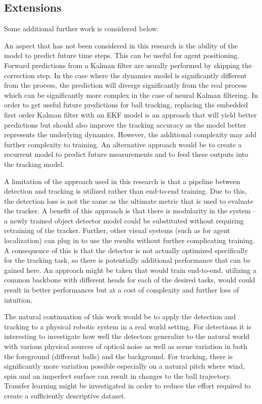 \documentclass[a4paper,twoside,12pt]{report}
\begin{document}
\subsection{Extensions}

Some additional further work is considered below:

An aspect that has not been considered in this research is the ability of the model to predict future time steps. This can be useful for agent positioning. Forward predictions from a Kalman filter are usually performed by skipping the correction step. In the case where the dynamics model is significantly different from the process, the prediction will diverge significantly from the real process which can be significantly more complex in the case of neural Kalman filtering. In order to get useful future predictions for ball tracking, replacing the embedded first order Kalman filter with an EKF model is an approach that will yield better predictions but should also improve the tracking accuracy as the model better represents the underlying dynamics. However, the additional complexity may add further complexity to training. An alternative approach would be to create a recurrent model to predict future measurements and to feed these outputs into the tracking model.

A limitation of the approach used in this research is that a pipeline between detection and tracking is utilized rather than end-to-end training. Due to this, the detection loss is not the same as the ultimate metric that is used to evaluate the tracker. A benefit of this approach is that there is modularity in the system -- a newly trained object detector model could be substituted without requiring retraining of the tracker. Further, other visual systems (such as for agent localization) can plug in to use the results without further complicating training. A consequence of this is that the detector is not actually optimized specifically for the tracking task, so there is potentially additional performance that can be gained here. An approach might be taken that would train end-to-end, utilizing a common backbone with different heads for each of the desired tasks, would could result in better performances but at a cost of complexity and further loss of intuition.

The natural continuation of this work would be to apply the detection and tracking to a physical robotic system in a real world setting. For detections it is interesting to investigate how well the detectors generalize to the natural world with various physical sources of optical noise as well as scene variation in both the foreground (different balls) and the background. For tracking, there is significantly more variation possible especially on a natural pitch where wind, spin and an imperfect surface can result in changes to the ball trajectory. Transfer learning might be investigated in order to reduce the effort required to create a sufficiently descriptive dataset.
\end{document}
